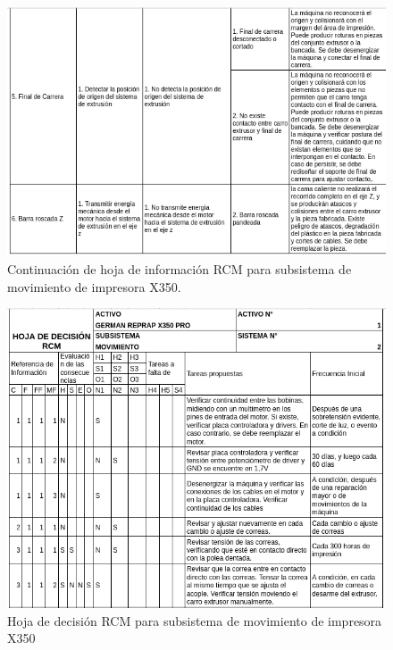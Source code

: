 \begin{figure}[H]
\centering
\includegraphics[scale=0.8]{images/amef23.png}
\caption{Continuación de hoja de información RCM para subsistema de movimiento de impresora X350.}
\end{figure}
\begin{figure}[H]
\centering
\includegraphics[scale=0.7]{images/decision21.png}
\caption{Hoja de decisión RCM para subsistema de movimiento de impresora X350}
\end{figure}

